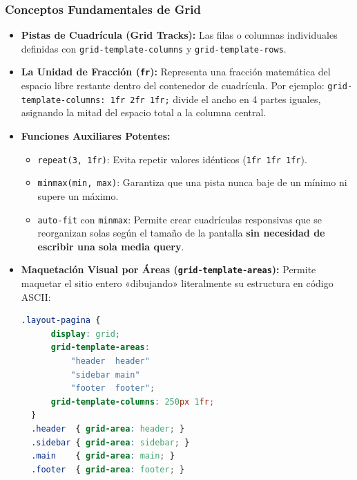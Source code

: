 \subsubsection{Conceptos Fundamentales de Grid}
\begin{itemize}[leftmargin=1.2cm]
  \item \textbf{Pistas de Cuadrícula (Grid Tracks):} Las filas o columnas individuales definidas con \texttt{grid-template-columns} y \texttt{grid-template-rows}.
  \item \textbf{La Unidad de Fracción (\texttt{fr}):} Representa una fracción matemática del espacio libre restante dentro del contenedor de cuadrícula. Por ejemplo: \texttt{grid-template-columns: 1fr 2fr 1fr;} divide el ancho en 4 partes iguales, asignando la mitad del espacio total a la columna central.
  \item \textbf{Funciones Auxiliares Potentes:}
    \begin{itemize}
      \item \texttt{repeat(3, 1fr)}: Evita repetir valores idénticos (\texttt{1fr 1fr 1fr}).
      \item \texttt{minmax(min, max)}: Garantiza que una pista nunca baje de un mínimo ni supere un máximo.
      \item \texttt{auto-fit} con \texttt{minmax}: Permite crear cuadrículas responsivas que se reorganizan solas según el tamaño de la pantalla \textbf{sin necesidad de escribir una sola media query}.
    \end{itemize}
  \item \textbf{Maquetación Visual por Áreas (\texttt{grid-template-areas}):} Permite maquetar el sitio entero «dibujando» literalmente su estructura en código ASCII:
  \begin{lstlisting}[language=css]
  .layout-pagina {
      display: grid;
      grid-template-areas:
          "header  header"
          "sidebar main"
          "footer  footer";
      grid-template-columns: 250px 1fr;
  }
  .header  { grid-area: header; }
  .sidebar { grid-area: sidebar; }
  .main    { grid-area: main; }
  .footer  { grid-area: footer; }
  \end{lstlisting}
\end{itemize}

